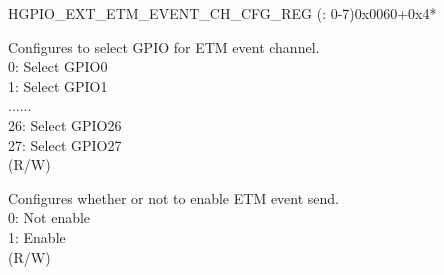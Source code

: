 \begin{register}{H}{GPIO\_EXT\_ETM\_EVENT\_CH\_CFG\_REG (: 0-7)}{0x0060+0x4*}\label{regdesc:GPIOSDETMEVENTCHNCFGREG}
%
%
%
%
\regnewline%
\begin{regdesc}\begin{reglist}
\label{fielddesc:GPIOSDETMCH0EVENTSEL}\item [GPIO\_EXT\_ETM\_CH\regindex{n}\_EVENT\_SEL] Configures to select GPIO for ETM event channel.\\
0: Select GPIO0\\
1: Select GPIO1\\
......\\
26: Select GPIO26\\
27: Select GPIO27\\ (R/W)
\label{fielddesc:GPIOSDETMCH0EVENTEN}\item [GPIO\_EXT\_ETM\_CH\regindex{n}\_EVENT\_EN] Configures whether or not to enable ETM event send.\\
0: Not enable\\
1: Enable\\(R/W)
\end{reglist}\end{regdesc}
\end{register}


